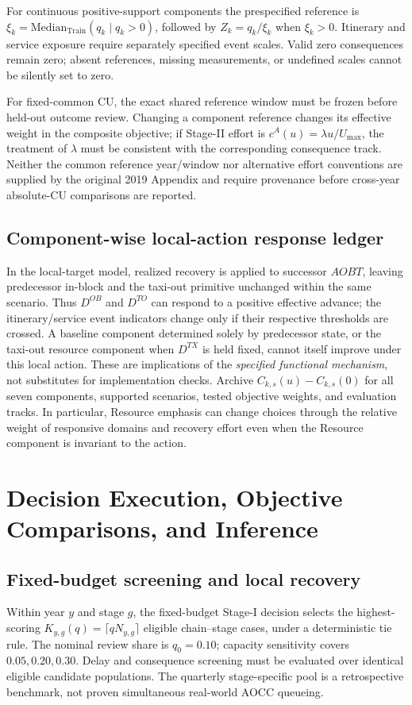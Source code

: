 \documentclass[10pt,a4paper]{article}
\numberwithin{equation}{section}
\begin{document}
For continuous positive-support components the prespecified reference is $\xi_k=\mathrm{Median}_{\mathrm{Train}}(q_k\mid q_k>0)$, followed by $Z_k=q_k/\xi_k$ when $\xi_k>0$. Itinerary and service exposure require separately specified event scales. Valid zero consequences remain zero; absent references, missing measurements, or undefined scales cannot be silently set to zero.

For fixed-common CU, the exact shared reference window must be frozen before held-out outcome review. Changing a component reference changes its effective weight in the composite objective; if Stage-II effort is $c^A(u)=\lambda u/U_{\max}$, the treatment of $\lambda$ must be consistent with the corresponding consequence track. Neither the common reference year/window nor alternative effort conventions are supplied by the original 2019 Appendix and require provenance before cross-year absolute-CU comparisons are reported.

\subsection{Component-wise local-action response ledger}
In the local-target model, realized recovery is applied to successor $AOBT$, leaving predecessor in-block and the taxi-out primitive unchanged within the same scenario. Thus $D^{OB}$ and $D^{TO}$ can respond to a positive effective advance; the itinerary/service event indicators change only if their respective thresholds are crossed. A baseline component determined solely by predecessor state, or the taxi-out resource component when $D^{TX}$ is held fixed, cannot itself improve under this local action. These are implications of the \emph{specified functional mechanism}, not substitutes for implementation checks. Archive $C_{k,s}(u)-C_{k,s}(0)$ for all seven components, supported scenarios, tested objective weights, and evaluation tracks. In particular, Resource emphasis can change choices through the relative weight of responsive domains and recovery effort even when the Resource component is invariant to the action.


\section{Decision Execution, Objective Comparisons, and Inference}
\label{sup:decisions}
\subsection{Fixed-budget screening and local recovery}
Within year $y$ and stage $g$, the fixed-budget Stage-I decision selects the highest-scoring $K_{y,g}(q)=\lceil qN_{y,g}\rceil$ eligible chain--stage cases, under a deterministic tie rule. The nominal review share is $q_0=0.10$; capacity sensitivity covers $0.05,0.20,0.30$. Delay and consequence screening must be evaluated over identical eligible candidate populations. The quarterly stage-specific pool is a retrospective benchmark, not proven simultaneous real-world AOCC queueing.
\end{document}
